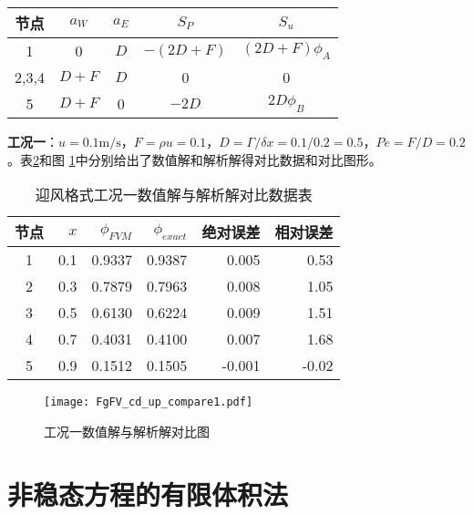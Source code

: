 \begin{table}[H]
  \begin{center}
  \label{TbFV_up_ex1_coefficient}
  \begin{tabular}{|c|c|c|c|c|}
    \hline
    节点 & $a_{W}$ & $a_{E}$ & $S_{P}$ & $S_{u}$
    \\
    \hline
    1 & 0 & $D$ & $-(2D+F)$ & $(2D+F)\phi_{A}$ \\
    \hline
    2,3,4 & $D+F$ & $D$ & 0 & 0 \\
    \hline
    5 & $D+F$ & 0 & $-2D$ & $2D\phi_{B}$ \\
    \hline
  \end{tabular}
  \end{center}
\end{table}

\textbf{工况一}：$u=0.1\mathrm{m/s}$，$F=\rho u=0.1$，$D=\Gamma/\delta
x=0.1/0.2=0.5$，$Pe=F/D=0.2$。表\ref{TbFV_up_ex1_result}和图
\ref{FgFV_up_ex1_compare}中分别给出了数值解和解析解得对比数据和对比图形。
\begin{table}[H]
  \begin{center}
    \caption{迎风格式工况一数值解与解析解对比数据表}
  \label{TbFV_up_ex1_result}
  \begin{tabular}{|c|r|r|r|r|r|}
    \hline
    节点 & $x$ & $\phi_{FVM}$ & $\phi_{exact}$ & 绝对误差 & 相对误差\\
    \hline
    1 & 0.1 & 0.9337 & 0.9387 & 0.005 & 0.53
    \\
    \hline
    2 & 0.3 & 0.7879 & 0.7963 & 0.008 & 1.05
    \\
    \hline
    3 & 0.5 & 0.6130 & 0.6224 & 0.009 & 1.51
    \\
    \hline
    4 & 0.7 & 0.4031 & 0.4100 & 0.007 & 1.68
    \\
    \hline
    5 & 0.9 & 0.1512 & 0.1505 & -0.001 & -0.02
    \\
    \hline
  \end{tabular}
  \end{center}
\end{table}

\begin{figure}[!htb]
  \centering
  \texttt{[image: FgFV\_cd\_up\_compare1.pdf]}
  \caption{工况一数值解与解析解对比图}
  \label{FgFV_up_ex1_compare}
\end{figure}
\section{非稳态方程的有限体积法}


